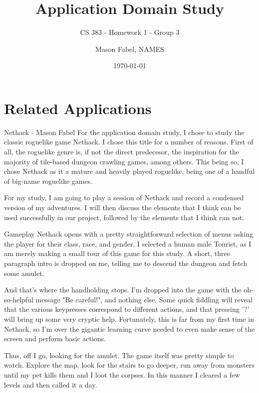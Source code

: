 \documentclass[12pt]{report}
\title{Application Domain Study}
\subtitle{CS 383 - Homework 1 - Group 3}
\author{Mason Fabel, NAMES} %
\date{\today}
\begin{document}
\maketitle

\chapter{Related Applications}


\begin{section}{Nethack - Mason Fabel}
For the application domain study, I chose to study the classic roguelike
game Nethack. I chose this title for a number of reasons. First of all,
the roguelike genre is, if not the direct predecesor, the inspiration for
the majority of tile-based dungeon crawling games, among others. This being
so, I chose Nethack as it a mature and heavily played roguelike, being one
of a handful of big-name roguelike games.

For my study, I am going to play a session of Nethack and record a
condensed version of my adventures. I will then discuss the elements that
I think can be used successfully in our project, followed by the elements
that I think can not.

\begin{subsection}{Gameplay}
Nethack opens with a pretty straightforward selection of menus asking the
player for their class, race, and gender. I selected a human male Tourist,
as I am merely making a small tour of this game for this study. A short,
three paragraph intro is dropped on me, telling me to descend the
dungeon and fetch some amulet.

And that's where the handholding stops. I'm dropped into the game with the
oh-so-helpful message "Be careful!", and nothing else. Some quick fiddling
will reveal that the various keypresses correspond to different actions,
and that pressing '?' will bring up some very cryptic help. Fortunately,
this is far from my first time in Nethack, so I'm over the gigantic
learning curve needed to even make sense of the screen and perform basic
actions.

Thus, off I go, looking for the amulet. The game itself was pretty simple
to watch. Explore the map, look for the stairs to go deeper, run away from
monsters until my pet kills them and I loot the corpses. In this manner I
cleared a few levels and then called it a day.
\end{subsection}


\end{section}
\end{document}
